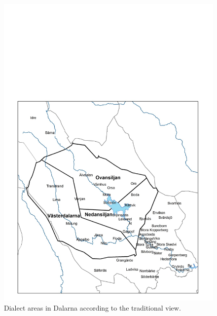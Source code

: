 \begin{figure}[h]

\includegraphics[height=.5\textheight]{figures/7_DialectAreasDalarnaTrad}
\caption{Dialect areas in Dalarna according to the traditional view.}
\label{map:6}

\end{figure}

